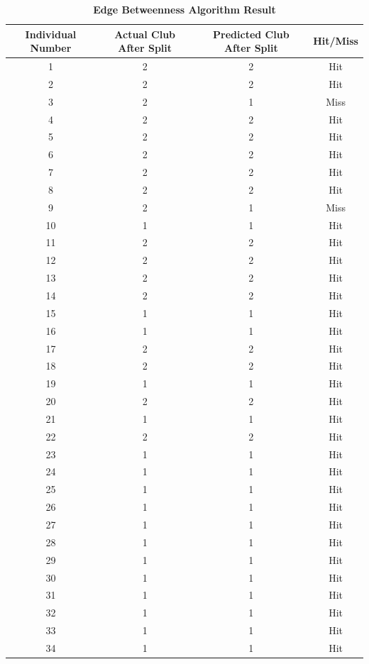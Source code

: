 \documentclass{article}
\begin{document}
		\begin{table}[!htb]
			\centering
			\caption{\textbf{Edge Betweenness Algorithm Result}}
			\begin{tabular}{cccc}
				\toprule
				\textbf{Individual Number} & \textbf{Actual Club After Split} & \textbf{Predicted Club After Split} & \textbf{Hit/Miss}\\
				\midrule
				1 & 2 & 2 & Hit\\
				2 & 2 & 2 & Hit\\
				3 & 2 & 1 & Miss\\
				4 & 2 & 2 & Hit\\
				5 & 2 & 2 & Hit\\
				6 & 2 & 2 & Hit\\
				7 & 2 & 2 & Hit\\
				8 & 2 & 2 & Hit\\
				9 & 2 & 1 & Miss\\
				10 & 1 & 1 & Hit\\
				11 & 2 & 2 & Hit\\
				12 & 2 & 2 & Hit\\
				13 & 2 & 2 & Hit\\
				14 & 2 & 2 & Hit\\
				15 & 1 & 1 & Hit\\
				16 & 1 & 1 & Hit\\
				17 & 2 & 2 & Hit\\
				18 & 2 & 2 & Hit\\
				19 & 1 & 1 & Hit\\
				20 & 2 & 2 & Hit\\
				21 & 1 & 1 & Hit\\
				22 & 2 & 2 & Hit\\
				23 & 1 & 1 & Hit\\
				24 & 1 & 1 & Hit\\
				25 & 1 & 1 & Hit\\
				26 & 1 & 1 & Hit\\
				27 & 1 & 1 & Hit\\
				28 & 1 & 1 & Hit\\
				29 & 1 & 1 & Hit\\
				30 & 1 & 1 & Hit\\
				31 & 1 & 1 & Hit\\
				32 & 1 & 1 & Hit\\
				33 & 1 & 1 & Hit\\
				34 & 1 & 1 & Hit\\
				\bottomrule
			\end{tabular}
		\end{table}
\end{document}
